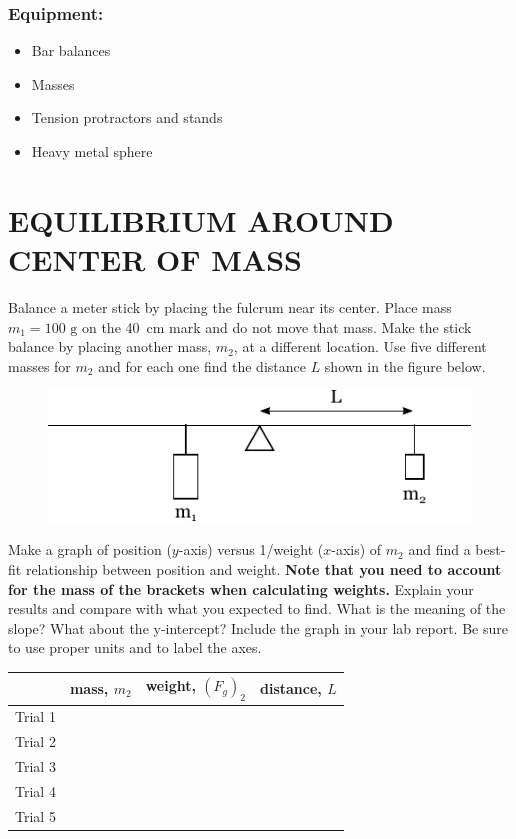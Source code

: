 \documentclass[11pt,letterpaper]{article}
\begin{document}
\subsubsection*{Equipment:}
\begin{itemize}
\setlength{\parskip}{3pt}
\item Bar balances
\item Masses
\item Tension protractors and stands
\item Heavy metal sphere
\end{itemize}

\section{EQUILIBRIUM AROUND CENTER OF MASS}
Balance a meter stick by placing the fulcrum near its center.  Place mass $m_1=100\mbox{ g}$ on the 40~cm mark and do not move that mass. Make the stick balance by placing another mass, $m_2$, at a different location. Use five different masses for $m_2$ and for each one find the distance $L$ shown in the figure below.

\begin{figure}[h]
\begin{center}
\includegraphics[]{./lab6_part1.pdf}
\end{center}
\end{figure}

Make a graph of position ($y$-axis) versus 1/weight ($x$-axis) of $m_2$ and find a best-fit relationship between position and weight. \textbf{Note that you need to account for the mass of the brackets when calculating weights.} Explain your results and compare with what you expected to find. What is the meaning of the slope? What about the y-intercept? Include the graph in your lab report. Be sure to use proper units and to label the axes.

\vspace{.5cm}

\renewcommand{\arraystretch}{1.4}
\begin{tabularx}{\linewidth}{|Y|Y|Y|Y|}
\hline
\vspace{2cm} & mass, $m_2$ & weight, $\left(F_g\right)_2$ & distance, $L$ \\
\hline Trial 1 &&&\\
\hline Trial 2 &&&\\
\hline Trial 3 &&&\\
\hline Trial 4 &&&\\
\hline Trial 5 &&&\\
\hline
\end{tabularx}\\
\end{document}
